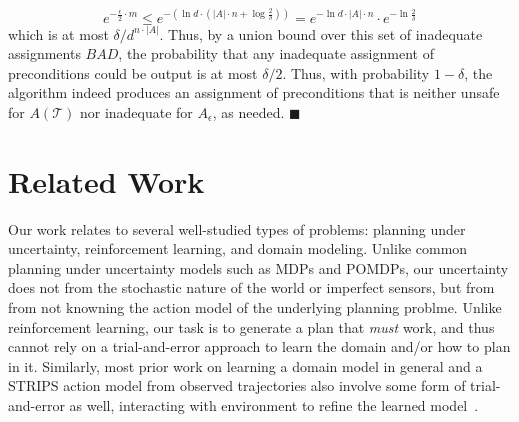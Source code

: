 \documentclass[letterpaper]{article}
\newenvironment{proof}{\noindent{\bf Proof:~~}}{\qed}
\newcommand{\qed}{\hfill\ensuremath{\blacksquare}}
\begin{document}
\begin{proof}
\begin{equation}
e^{-\frac{\epsilon}{2} \cdot m}
\leq 
e^{-(\ln d \cdot (|A|\cdot n+\log\frac{2}{\delta}))}
=e^{-\ln d \cdot |A|\cdot n}\cdot e^{-\ln  \frac{2}{\delta}}
\end{equation}
which is at most $\delta/d^{n\cdot |A|}$. Thus, by a union bound over this set of inadequate assignments $BAD$, the probability that any inadequate assignment of preconditions could be output is at most $\delta/2$.
Thus, with probability $1-\delta$, the algorithm indeed produces an assignment of preconditions that is neither unsafe for $A(\mathcal{T})$ nor inadequate for $A_\epsilon$, as needed.
\end{proof}


\section{Related Work}

Our work relates to several well-studied types of problems: planning under uncertainty, reinforcement learning, and domain modeling. 
Unlike common planning under uncertainty models such as MDPs and POMDPs, our uncertainty does not 
from the stochastic nature of the world or imperfect sensors, but from from not knowning the action model of the underlying planning problme. Unlike reinforcement learning, our task is to generate a plan that {\em must} work, and thus cannot rely on a trial-and-error approach to learn the domain and/or how to plan in it. 
Similarly, most prior work on learning a domain model in general and a STRIPS action model from observed trajectories also involve some form of trial-and-error as well, interacting with environment to refine the learned model~\cite{mourao2012learning,wang1994learning,wang1994learning,walsh2008efficientLearning,levine2006explanation,jimenez2013integrating}. 
\end{document}
